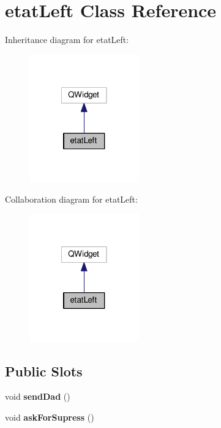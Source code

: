 \hypertarget{classetat_left}{\section{etat\-Left Class Reference}
\label{classetat_left}
}


Inheritance diagram for etat\-Left\-:
\nopagebreak
\begin{figure}[H]
\begin{center}
\leavevmode
\includegraphics[width=134pt]{classetat_left__inherit__graph}
\end{center}
\end{figure}


Collaboration diagram for etat\-Left\-:
\nopagebreak
\begin{figure}[H]
\begin{center}
\leavevmode
\includegraphics[width=134pt]{classetat_left__coll__graph}
\end{center}
\end{figure}
\subsection*{Public Slots}
\begin{DoxyCompactItemize}
\item 
\hypertarget{classetat_left_a39c9a7992253a787aeaa9a2b2be5a806}{void {\bfseries send\-Dad} ()}\label{classetat_left_a39c9a7992253a787aeaa9a2b2be5a806}

\item 
\hypertarget{classetat_left_a541d2de7f5227a558e6753f53c6b7ae6}{void {\bfseries ask\-For\-Supress} ()}\label{classetat_left_a541d2de7f5227a558e6753f53c6b7ae6}

\end{DoxyCompactItemize}

